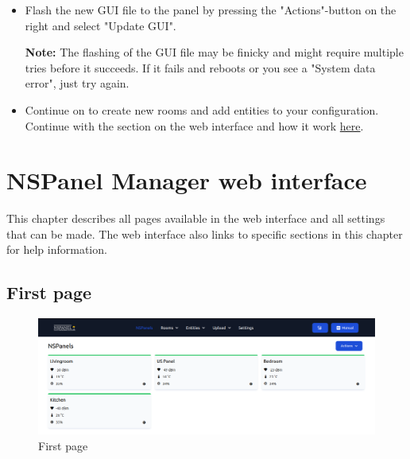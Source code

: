 \documentclass[10pt]{article}
\newcommand{\info}[1]{\begin{infoBox} \textbf{Info:} #1 \end{infoBox}}
\newcommand{\note}[1]{\begin{noteBox} \textbf{Note:} #1 \end{noteBox}}
\begin{document}
\begin{itemize}
      \info{If this is a US NSPanel version then it has to be set in the panel settings. Press the name of the NSPanel in the list and check the "Is US panel"-checkbox.}
      \item Flash the new GUI file to the panel by pressing the "Actions"-button on the right and select "Update GUI".
      \note{The flashing of the GUI file may be finicky and might require multiple tries before it succeeds. If it fails and reboots or you see a "System data error", just try again.}
    \item Continue on to create new rooms and add entities to your configuration. Continue with the section on the web interface and how it work \hyperref[sec:nspanelmanager_web_interface]{here}.
    \end{itemize}

    \clearpage
    \section{NSPanel Manager web interface}
    \label{sec:nspanelmanager_web_interface}
    This chapter describes all pages available in the web interface and all settings that can be made. The web interface also links to specific sections in this chapter for help information.
    \subsection{First page}

    \begin{figure}[H]
    \centering
    \includegraphics[width=\textwidth,height=\textheight,keepaspectratio]{index_page.png}
    \caption{First page}%
    \end{figure}
\end{document}
